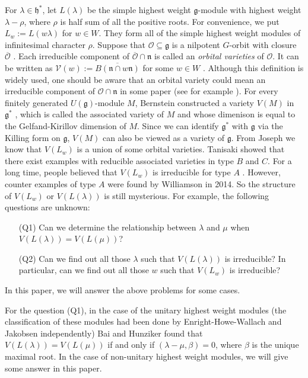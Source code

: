 \documentclass{amsart}[12pt]
\newcommand{\frg}{\mathfrak{g}}
\newcommand{\frh}{\mathfrak{h}}
\numberwithin{equation}{section}
\begin{document}
For $\lambda\in\frh^*$, let $L(\lambda)$ be the simple highest weight $\mathfrak{g}$-module with highest weight $\lambda-\rho$, where $\rho$ is half sum of all the positive roots. For convenience, we put $L_w:=L(w\lambda)$ for $w\in W$. They form all of the simple highest weight modules of infinitesimal character $\rho$. Suppose that $\mathcal{O}\subseteq \mathfrak{g}$ is a nilpotent $G$-orbit with closure $\overline{\mathcal{O}}$ \cite{CM}. Each irreducible component of $\overline{\mathcal{O}}\cap \mathfrak{n}$ is called an {\it orbital varieties} of  $\mathcal{O}$. It can be written as $\mathcal{V}(w):=\overline{B(\mathfrak{n}\cap w\mathfrak{n})}$ for some $w\in W$ \cite{Ta}. Although this definition is widely used, one should be aware that an orbital variety could mean an irreducible component of $\mathcal{O}\cap \mathfrak{n}$ in some paper (see for example \cite{Jo84}). For every finitely generated $U(\mathfrak{g})$-module $M$, Bernstein  constructed a variety $V(M)$ in $\mathfrak{g}^{\ast}$ \cite{Be}, which is called the associated variety of $M$ and whose dimenison is equal to the Gelfand-Kirillov dimension of $M$. Since we can identify $\frg^*$ with $\frg$ via the Killing form on $\frg$, $V(M)$ can also be viewed as a variety of $\frg$. From Joseph \cite{Jo84} we know that $V(L_w)$ is a union of some orbital varieties. Tanisaki \cite{Ta} showed that there exist examples with reducible associated varieties in type $B$ and $C$. For a long time, people believed that $V(L_w)$ is irreducible for type $A$ \cite{BoB3, Mel}. However, counter examples of type $A$ were found by Williamson in 2014\cite{Wi}. So the structure of $V(L_w)$ or $V(L(\lambda))$ is still mysterious. For example, the following questions are unknown:
\begin{itemize}
  \item [(Q1)] Can we determine the relationship between $\lambda$ and $\mu$ when $V(L(\lambda))=V(L(\mu)) $?
  \item [(Q2)] Can we find out all those $\lambda$ such that $V(L(\lambda)) $ is irreducible? In particular, can we find out all those $w$ such that $V(L_w) $ is irreducible?

\end{itemize}

In this paper, we will answer the above problems for some cases.



For the question (Q1), in the case of  the unitary highest weight modules (the classification of these modules had been done by Enright-Howe-Wallach \cite{EHW} and Jakobsen \cite{Ja} independently) Bai and Hunziker \cite{BH}  found that $V(L(\lambda))=V(L(\mu)) $ if and only if $(\lambda-\mu,\beta)=0$,  where $\beta$ is the unique maximal root. In the case of non-unitary highest weight modules, we will give some answer in this paper.
\end{document}

